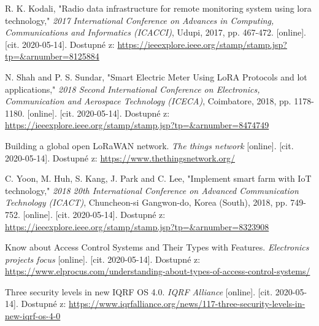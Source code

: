 \begin{thebibliography}{9}
R. K. Kodali, "Radio data infrastructure for remote monitoring system using lora technology," \textit{2017 International Conference on Advances in Computing, Communications and Informatics (ICACCI)}, Udupi, 2017, pp. 467-472.
[online]. [cit. 2020-05-14]. Dostupné z: 
\url{
https://ieeexplore.ieee.org/stamp/stamp.jsp?tp=&arnumber=8125884
}
 


N. Shah and P. S. Sundar, "Smart Electric Meter Using LoRA Protocols and lot applications," \textit{2018 Second International Conference on Electronics, Communication and Aerospace Technology (ICECA)}, Coimbatore, 2018, pp. 1178-1180.
[online]. [cit. 2020-05-14]. Dostupné z: 
\url{
https://ieeexplore.ieee.org/stamp/stamp.jsp?tp=&arnumber=8474749
}
 


Building a global open LoRaWAN network. \textit{ The things network } [online]. [cit. 2020-05-14]. Dostupné z: 
\url{
https://www.thethingsnetwork.org/
}



C. Yoon, M. Huh, S. Kang, J. Park and C. Lee, "Implement smart farm with IoT technology," \textit{2018 20th International Conference on Advanced Communication Technology (ICACT)}, Chuncheon-si Gangwon-do, Korea (South), 2018, pp. 749-752.
[online]. [cit. 2020-05-14]. Dostupné z: 
\url{
https://ieeexplore.ieee.org/stamp/stamp.jsp?tp=&arnumber=8323908
}
 



Know about Access Control Systems and Their Types with Features. \textit{Electronics projects focus}
[online]. [cit. 2020-05-14]. Dostupné z: 
\url{
https://www.elprocus.com/understanding-about-types-of-access-control-systems/
}
 




Three security levels in new IQRF OS 4.0. 
\textit{IQRF Alliance } 
[online]. [cit. 2020-05-14]. Dostupné z: 
\url{
https://www.iqrfalliance.org/news/117-three-security-levels-in-new-iqrf-os-4-0
}



\end{thebibliography}
